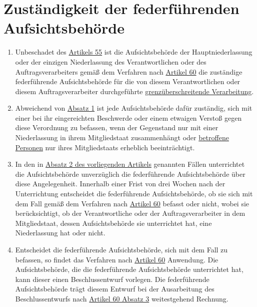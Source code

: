 \chapter{Zuständigkeit der federführenden Aufsichtsbehörde}
\label{ch:56}


\begin{enumerate}

  \item Unbeschadet des \hyperref[ch:55]{Artikels 55} ist die Aufsichtsbehörde der Hauptniederlassung oder der einzigen
   Niederlassung des Verantwortlichen oder des Auftragsverarbeiters gemäß dem Verfahren nach \hyperref[ch:60]
   {Artikel 60} die zuständige federführende Aufsichtsbehörde für die von diesem Verantwortlichen oder diesem
   Auftragsverarbeiter durchgeführte \hyperref[itm:04-23]{grenzüberschreitende Verarbeitung}.
  \label{itm:56-1}

  \item Abweichend von \hyperref[itm:56-1]{Absatz 1} ist jede Aufsichtsbehörde dafür zuständig, sich mit einer bei ihr
   eingereichten Beschwerde oder einem etwaigen Verstoß gegen diese Verordnung zu befassen, wenn der Gegenstand nur mit
   einer Niederlassung in ihrem Mitgliedstaat zusammenhängt oder \hyperref[itm:04-1]{betroffene Personen} nur ihres Mitgliedstaats erheblich
   beeinträchtigt.
  \label{itm:56-2}

  \item In den in \hyperref[itm:56-2]{Absatz 2 des vorliegenden Artikels} genannten Fällen unterrichtet die
   Aufsichtsbehörde unverzüglich die federführende Aufsichtsbehörde über diese Angelegenheit. Innerhalb einer Frist von
   drei Wochen nach der Unterrichtung entscheidet die federführende Aufsichtsbehörde, ob sie sich mit dem Fall gemäß
   dem Verfahren nach \hyperref[ch:60]{Artikel 60} befasst oder nicht, wobei sie berücksichtigt, ob der Verantwortliche
   oder der Auftragsverarbeiter in dem Mitgliedstaat, dessen Aufsichtsbehörde sie unterrichtet hat, eine Niederlassung
   hat oder nicht.
  \label{itm:56-3}

  \item Entscheidet die federführende Aufsichtsbehörde, sich mit dem Fall zu befassen, so findet das Verfahren nach
   \hyperref[ch:60]{Artikel 60} Anwendung. Die Aufsichtsbehörde, die die federführende Aufsichtsbehörde unterrichtet
    hat, kann dieser einen Beschlussentwurf vorlegen. Die federführende Aufsichtsbehörde trägt diesem Entwurf bei der
    Ausarbeitung des Beschlussentwurfs nach \hyperref[itm:60-3]{Artikel 60 Absatz 3} weitestgehend Rechnung.
  \label{itm:56-4}


\end{enumerate}
